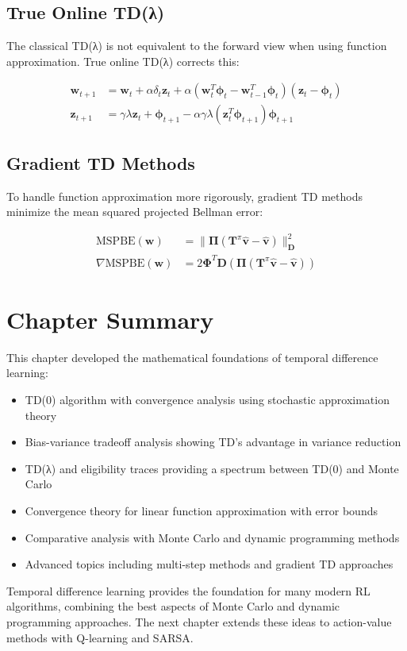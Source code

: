 \subsection{True Online TD(λ)}

The classical TD(λ) is not equivalent to the forward view when using function approximation. True online TD(λ) corrects this:

\begin{align}
\mathbf{w}_{t+1} &= \mathbf{w}_t + \alpha \delta_t \mathbf{z}_t + \alpha(\mathbf{w}_t^T \boldsymbol{\phi}_t - \mathbf{w}_{t-1}^T \boldsymbol{\phi}_t)(\mathbf{z}_t - \boldsymbol{\phi}_t) \\
\mathbf{z}_{t+1} &= \gamma \lambda \mathbf{z}_t + \boldsymbol{\phi}_{t+1} - \alpha \gamma \lambda (\mathbf{z}_t^T \boldsymbol{\phi}_{t+1})\boldsymbol{\phi}_{t+1}
\end{align}

\subsection{Gradient TD Methods}

To handle function approximation more rigorously, gradient TD methods minimize the mean squared projected Bellman error:

\begin{align}
\text{MSPBE}(\mathbf{w}) &= \|\boldsymbol{\Pi}(\mathbf{T}^\pi \hat{\mathbf{v}} - \hat{\mathbf{v}})\|_{\mathbf{D}}^2 \\
\nabla \text{MSPBE}(\mathbf{w}) &= 2\boldsymbol{\Phi}^T \mathbf{D} (\boldsymbol{\Pi}(\mathbf{T}^\pi \hat{\mathbf{v}} - \hat{\mathbf{v}}))
\end{align}

\section{Chapter Summary}

This chapter developed the mathematical foundations of temporal difference learning:

\begin{itemize}
    \item TD(0) algorithm with convergence analysis using stochastic approximation theory
    \item Bias-variance tradeoff analysis showing TD's advantage in variance reduction
    \item TD(λ) and eligibility traces providing a spectrum between TD(0) and Monte Carlo
    \item Convergence theory for linear function approximation with error bounds
    \item Comparative analysis with Monte Carlo and dynamic programming methods
    \item Advanced topics including multi-step methods and gradient TD approaches
\end{itemize}

Temporal difference learning provides the foundation for many modern RL algorithms, combining the best aspects of Monte Carlo and dynamic programming approaches. The next chapter extends these ideas to action-value methods with Q-learning and SARSA.